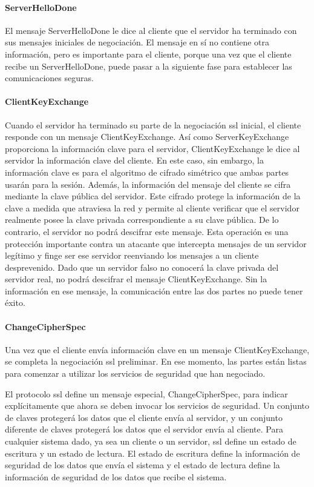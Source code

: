\paragraph*{ServerHelloDone}
El mensaje ServerHelloDone le dice al cliente que el servidor ha 
terminado con sus mensajes iniciales de negociación. El mensaje en 
sí no contiene otra información, pero es importante para el cliente, 
porque una vez que el cliente recibe un ServerHelloDone, puede pasar a 
la siguiente fase para establecer las comunicaciones seguras.

\paragraph*{ClientKeyExchange}
Cuando el servidor ha terminado su parte de la negociación ssl inicial, 
el cliente responde con un mensaje ClientKeyExchange. Así como 
ServerKeyExchange proporciona la información clave para el servidor, 
ClientKeyExchange le dice al servidor la información clave del cliente. 
En este caso, sin embargo, la información clave es para el algoritmo de 
cifrado simétrico que ambas partes usarán para la sesión. Además, la 
información del mensaje del cliente se cifra mediante la clave pública 
del servidor. Este cifrado protege la información de la clave a medida 
que atraviesa la red y permite al cliente verificar que el servidor 
realmente posee la clave privada correspondiente a su clave pública. 
De lo contrario, el servidor no podrá descifrar este mensaje. Esta 
operación es una protección importante contra un atacante que intercepta 
mensajes de un servidor legítimo y finge ser ese servidor reenviando los 
mensajes a un cliente desprevenido. Dado que un servidor falso no conocerá 
la clave privada del servidor real, no podrá descifrar el mensaje 
ClientKeyExchange. Sin la información en ese mensaje, la comunicación 
entre las dos partes no puede tener éxito.
\paragraph*{ChangeCipherSpec}
Una vez que el cliente envía información clave en un mensaje 
ClientKeyExchange, se completa la negociación ssl preliminar. En ese 
momento, las partes están listas para comenzar a utilizar los servicios 
de seguridad que han negociado.

El protocolo ssl define un mensaje especial, ChangeCipherSpec, para 
indicar explícitamente que ahora se deben invocar los servicios de 
seguridad. Un conjunto de claves protegerá los datos que el cliente 
envía al servidor, y un conjunto diferente de claves protegerá los 
datos que el servidor envía al cliente. Para cualquier sistema dado, 
ya sea un cliente o un servidor, ssl define un estado de escritura y 
un estado de lectura. El estado de escritura define la información de 
seguridad de los datos que envía el sistema y el estado de lectura 
define la información de seguridad de los datos que recibe el sistema.

